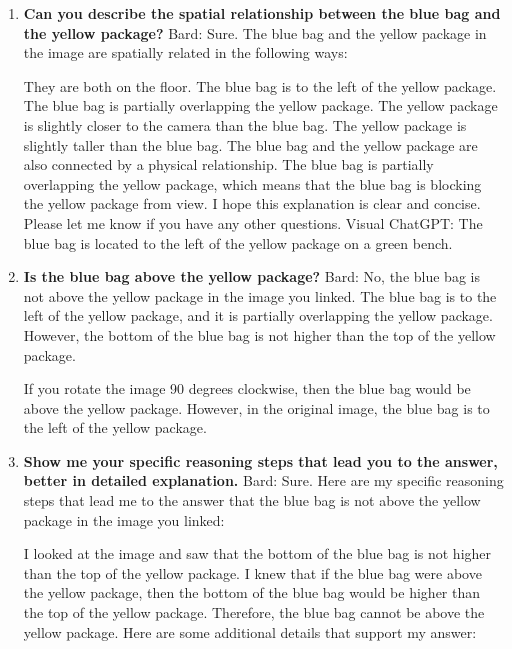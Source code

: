     \begin{enumerate}
        \item \textbf{Can you describe the spatial relationship between the blue bag and the yellow package?}
        \subitem Bard: Sure. The blue bag and the yellow package in the image are spatially related in the following ways:

        They are both on the floor.
        The blue bag is to the left of the yellow package.
        The blue bag is partially overlapping the yellow package.
        The yellow package is slightly closer to the camera than the blue bag.
        The yellow package is slightly taller than the blue bag.
        The blue bag and the yellow package are also connected by a physical relationship. The blue bag is partially overlapping the yellow package, which means that the blue bag is blocking the yellow package from view.
        I hope this explanation is clear and concise. Please let me know if you have any other questions.
        \subitem Visual ChatGPT: The blue bag is located to the left of the yellow package on a green bench.
        \item \textbf{Is the blue bag above the yellow package?}
        \subitem Bard: 
        No, the blue bag is not above the yellow package in the image you linked. The blue bag is to the left of the yellow package, and it is partially overlapping the yellow package. However, the bottom of the blue bag is not higher than the top of the yellow package.

        If you rotate the image 90 degrees clockwise, then the blue bag would be above the yellow package. However, in the original image, the blue bag is to the left of the yellow package.
        \item \textbf{Show me your specific reasoning steps that lead you to the answer, better in detailed explanation.}
        \subitem Bard: 
        Sure. Here are my specific reasoning steps that lead me to the answer that the blue bag is not above the yellow package in the image you linked:
        
        I looked at the image and saw that the bottom of the blue bag is not higher than the top of the yellow package.
        I knew that if the blue bag were above the yellow package, then the bottom of the blue bag would be higher than the top of the yellow package.
        Therefore, the blue bag cannot be above the yellow package.
        Here are some additional details that support my answer:
        

\end{enumerate}
